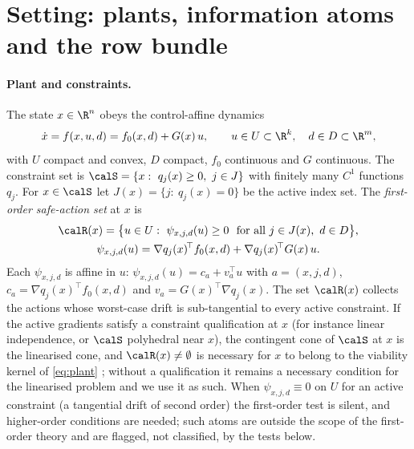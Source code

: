\section{Setting: plants, information atoms and the row bundle}\label{sec:setting}

\paragraph{Plant and constraints.} The state $x\in\R^n$ obeys the control-affine dynamics
\begin{equation}\label{eq:plant}
\dot x=f(x,u,d)=f_0(x,d)+G(x)\,u,\qquad u\in U\subset\R^k,\quad d\in D\subset\R^m,
\end{equation}
with $U$ compact and convex, $D$ compact, $f_0$ continuous and $G$ continuous. The constraint set is $\calS=\{x:\ q_j(x)\ge0,\ j\in J\}$ with finitely many $C^1$ functions $q_j$. For $x\in\calS$ let $J(x)=\{j:\ q_j(x)=0\}$ be the active index set. The \emph{first-order safe-action set} at $x$ is
\begin{equation}\label{eq:R}
\begin{gathered}
\calR(x)=\bigl\{u\in U:\ \psi_{x,j,d}(u)\ge0\ \text{ for all } j\in J(x),\ d\in D\bigr\},\\
\psi_{x,j,d}(u)=\nabla q_j(x)^{\!\top}f_0(x,d)+\nabla q_j(x)^{\!\top}G(x)\,u .
\end{gathered}
\end{equation}
Each $\psi_{x,j,d}$ is affine in $u$: $\psi_{x,j,d}(u)=c_a+v_a^{\top}u$ with $a=(x,j,d)$, $c_a=\nabla q_j(x)^\top f_0(x,d)$ and $v_a=G(x)^\top\nabla q_j(x)$. The set $\calR(x)$ collects the actions whose worst-case drift is sub-tangential to every active constraint. If the active gradients satisfy a constraint qualification at $x$ (for instance linear independence, or $\calS$ polyhedral near $x$), the contingent cone of $\calS$ at $x$ is the linearised cone, and $\calR(x)\neq\emptyset$ is necessary for $x$ to belong to the viability kernel of \eqref{eq:plant} \cite{Aubin1991,Nagumo1942}; without a qualification it remains a necessary condition for the linearised problem and we use it as such. When $\psi_{x,j,d}\equiv0$ on $U$ for an active constraint (a tangential drift of second order) the first-order test is silent, and higher-order conditions are needed; such atoms are outside the scope of the first-order theory and are flagged, not classified, by the tests below.

